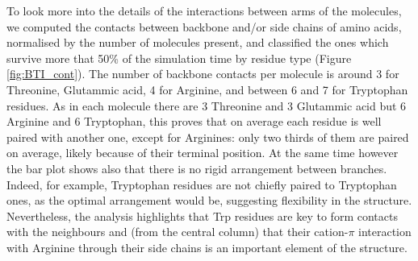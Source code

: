 To look more into the details of the interactions between arms of the molecules, we computed the contacts between backbone and/or side chains of amino acids, normalised by the number of molecules present, and classified the ones which survive more that 50\% of the simulation time by residue type (Figure \ref{fig:BTI_cont}). 
%
The number of backbone contacts per molecule is around 3 for Threonine, Glutammic acid, 4 for Arginine, and between 6 and 7 for Tryptophan residues.
%
As in each molecule there are 3 Threonine and 3 Glutammic acid but 6 Arginine and 6 Tryptophan, this proves that on average each residue is well paired with another one, except for Arginines: only two thirds of them are paired on average, likely because of their terminal position.
%
At the same time however the bar plot shows also that there is no rigid arrangement between branches. Indeed, for example, Tryptophan residues are not chiefly paired to Tryptophan ones, as the optimal arrangement would be, suggesting flexibility in the structure.
%
Nevertheless, the analysis highlights that Trp residues are key to form contacts with the neighbours and (from the central column) that their cation-$\pi$ interaction with Arginine through their side chains is an important element of the structure.

